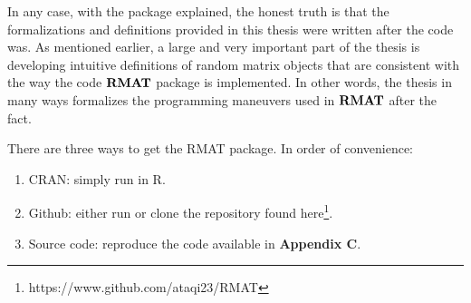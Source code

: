 In any case, with the package explained, the honest truth is that the formalizations and definitions provided in this thesis were written after the code was.
As mentioned earlier, a large and very important part of the thesis is developing intuitive definitions of random matrix objects that are consistent with the way the code ${\textbf{RMAT}}$ package is implemented.
In other words, the thesis in many ways formalizes the programming maneuvers used in ${\textbf{RMAT}}$ after the fact. \\


There are three ways to get the RMAT package. In order of convenience:

\begin{enumerate}
  \item CRAN: simply run  in R.
  \item Github: either run  or clone the repository found here\footnote{https://www.github.com/ataqi23/RMAT}.
  \item Source code: reproduce the code available in \textbf{Appendix C}.
\end{enumerate}
